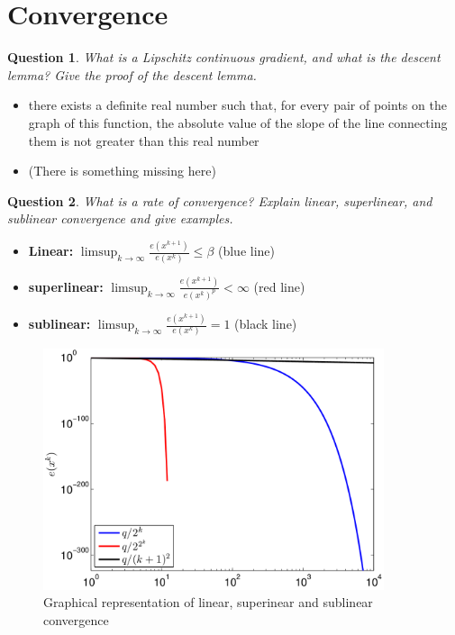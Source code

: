 \documentclass{article}
\newtheorem{question}{Question}
\begin{document}
\begin{itemize}
\begin{itemize}
  \end{itemize}
\end{itemize}

\section{Convergence}

\begin{question}
  What is a Lipschitz continuous gradient, and what is the descent lemma?  Give the proof of the
  descent lemma.
\end{question}
\begin{itemize}

\item there exists a definite real number such that, for every pair of points on the graph of this
  function, the absolute value of the slope of the line connecting them is not greater than this
  real number
  
\item (There is something missing here)
  
\end{itemize}

\begin{question}
  What is a rate of convergence? Explain linear, superlinear, and sublinear convergence and give
  examples.
\end{question}
\begin{itemize}
\item \textbf{Linear:} $\limsup_{k \rightarrow \infty} \frac{e(x^{k+1})}{e(x^k)}\leq \beta$ (blue line)
\item \textbf{superlinear:} $\limsup_{k \rightarrow \infty} \frac{e(x^{k+1})}{e(x^k)^p} < \infty$ (red line)
\item \textbf{sublinear:} $\limsup_{k \rightarrow \infty} \frac{e(x^{k+1})}{e(x^k)} = 1$ (black line)
\end{itemize}

\begin{figure}[H]
  \includegraphics[width=10cm]{convergence.png}
  \caption{Graphical representation of linear, superinear and sublinear
    convergence \label{fig:desc_dir}}
\end{figure}
\end{document}
